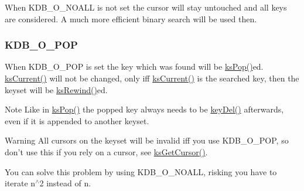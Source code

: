 When K\-D\-B\-\_\-\-O\-\_\-\-N\-O\-A\-L\-L is not set the cursor will stay untouched and all keys are considered. A much more efficient binary search will be used then.\hypertarget{group__keyset_KDB_O_POP}{}\subsubsection{K\-D\-B\-\_\-\-O\-\_\-\-P\-O\-P}\label{group__keyset_KDB_O_POP}
When K\-D\-B\-\_\-\-O\-\_\-\-P\-O\-P is set the key which was found will be \hyperlink{group__keyset_gae42530b04defb772059de0600159cf69}{ks\-Pop()}ed. \hyperlink{group__keyset_ga4287b9416912c5f2ab9c195cb74fb094}{ks\-Current()} will not be changed, only iff \hyperlink{group__keyset_ga4287b9416912c5f2ab9c195cb74fb094}{ks\-Current()} is the searched key, then the keyset will be \hyperlink{group__keyset_gabe793ff51f1728e3429c84a8a9086b70}{ks\-Rewind()}ed.

\begin{DoxyNote}{Note}
Like in \hyperlink{group__keyset_gae42530b04defb772059de0600159cf69}{ks\-Pop()} the popped key always needs to be \hyperlink{group__key_ga3df95bbc2494e3e6703ece5639be5bb1}{key\-Del()} afterwards, even if it is appended to another keyset.
\end{DoxyNote}
\begin{DoxyWarning}{Warning}
All cursors on the keyset will be invalid iff you use K\-D\-B\-\_\-\-O\-\_\-\-P\-O\-P, so don't use this if you rely on a cursor, see \hyperlink{group__keyset_gaffe507ab9281c322eb16c3e992075d29}{ks\-Get\-Cursor()}.
\end{DoxyWarning}
You can solve this problem by using K\-D\-B\-\_\-\-O\-\_\-\-N\-O\-A\-L\-L, risking you have to iterate n$^\wedge$2 instead of n.


